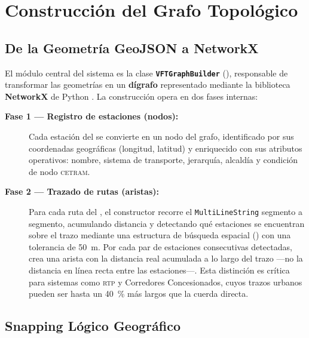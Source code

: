 \section{Construcción del Grafo Topológico}
\label{sec:vft-grafo}

\subsection{De la Geometría GeoJSON a NetworkX}
\label{subsec:vft-geom-networkx}

El módulo central del sistema es la clase \texttt{\textbf{VFTGraphBuilder}}\allowbreak{}
(), responsable de transformar las
geometrías \geojson{} en un \textbf{dígrafo\DIFdelbegin {}\DIFdelend } representado mediante la
biblioteca \textbf{NetworkX} de Python \parencite{hagberg2008networkx}. La
construcción opera en dos fases internas:

\begin{description}
    \item[\textbf{Fase 1 — Registro de estaciones (nodos):}]
    Cada estación del \geojson{} se convierte en un nodo del grafo,
    identificado por sus coordenadas geográficas (longitud, latitud) y
    enriquecido con sus atributos operativos: nombre, sistema de transporte,
    jerarquía, alcaldía y condición de nodo \textsc{cetram}.

    \item[\textbf{Fase 2 — Trazado de rutas (aristas):}]
    Para cada ruta del \geojson{}, el constructor recorre el
    \texttt{MultiLineString} segmento a segmento, acumulando distancia y
    detectando qué estaciones se encuentran sobre el trazo mediante una
    estructura de búsqueda espacial () con una tolerancia de
    50~m. Por cada par de estaciones consecutivas detectadas, crea una arista
    con la distancia real acumulada a lo largo del trazo —no la distancia en
    línea recta entre las estaciones—. Esta distinción es crítica para sistemas
    como \textsc{rtp} y Corredores Concesionados, cuyos trazos urbanos pueden
    ser hasta un 40~\% más largos que la cuerda directa.
\end{description}
\subsection{Snapping Lógico Geográfico}
\label{subsec:vft-snapping}

